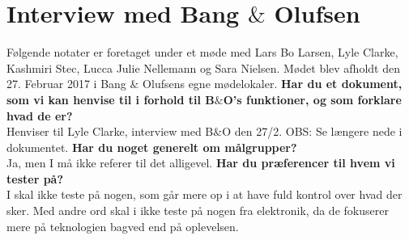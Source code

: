 \chapter{Interview med Bang $\&$ Olufsen}
\label{app:InterviewLyleClarke}
%
Følgende notater er foretaget under et møde med Lars Bo Larsen, Lyle Clarke, Kashmiri Stec, Lucca Julie Nellemann og Sara Nielsen. Mødet blev afholdt den 27. Februar 2017 i Bang $\&$ Olufsens egne mødelokaler. \blankline
% 
\textbf{Har du et dokument, som vi kan henvise til i forhold til B$\&$O’s funktioner, og som forklare hvad de er?}\\
Henviser til Lyle Clarke, interview med B$\&$O den 27/2. OBS: Se længere nede i dokumentet.\blankline
%
\textbf{Har du noget generelt om målgrupper?}\\ 
Ja, men I må ikke referer til det alligevel. \blankline
%
\textbf{Har du præferencer til hvem vi tester på?}\\
I skal ikke teste på nogen, som går mere op i at have fuld kontrol over hvad der sker. Med andre ord skal i ikke teste på nogen fra elektronik, da de fokuserer mere på teknologien bagved end på oplevelsen. 

